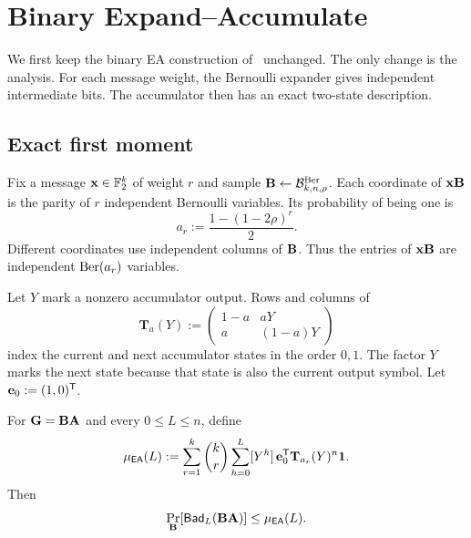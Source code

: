 \section{Binary Expand--Accumulate}
\label{sec:binary-ea}

We first keep the binary EA construction of~\cite{EA} unchanged.  The only
change is the analysis.  For each message weight, the Bernoulli expander gives
independent intermediate bits.  The accumulator then has an exact two-state
description.

\subsection{Exact first moment}

Fix a message $\mathbf x\in\mathbb F_2^k$ of weight $r$ and sample
$\mathbf B\gets\mathcal B^{\mathrm{Ber}}_{k,n,\rho}$.  Each coordinate of $\mathbf x\mathbf B$ is
the parity of $r$ independent Bernoulli variables.  Its probability of being
one is
\begin{equation}
 a_r:=\frac{1-(1-2\rho)^r}{2}.
 \label{eq:ea-activation}
\end{equation}
Different coordinates use independent columns of $\mathbf B$.  Thus the entries of
$\mathbf x\mathbf B$ are independent $\operatorname{Ber}(a_r)$ variables.

Let $Y$ mark a nonzero accumulator output.  Rows and columns of
\begin{equation}
 \mathbf T_a(Y):=
 \begin{pmatrix}
  1-a & aY\\
  a   & (1-a)Y
 \end{pmatrix}
 \label{eq:ea-transfer}
\end{equation}
index the current and next accumulator states in the order $0,1$.  The factor
$Y$ marks the next state because that state is also the current output symbol.
Let $\mathbf e_0:=(1,0)^{\mathsf T}$.

\begin{theorem}
\label{thm:ea-exact-first-moment}
For $\mathbf G=\mathbf B\mathbf A$ and every $0\leq L\leq n$, define
\begin{equation}
 \mu_{\mathsf{EA}}(L):=
 \sum_{r=1}^{k}\binom{k}{r}
 \sum_{h=0}^{L}[Y^h]\,
 \mathbf e_0^{\mathsf T}\mathbf T_{a_r}(Y)^n\mathbf 1.
 \label{eq:ea-first-moment}
\end{equation}
Then
\begin{equation}
 \Pr_{\mathbf B}[\mathsf{Bad}_L(\mathbf B\mathbf A)]\leq\mu_{\mathsf{EA}}(L).
 \label{eq:ea-first-moment-failure}
\end{equation}
\end{theorem}

